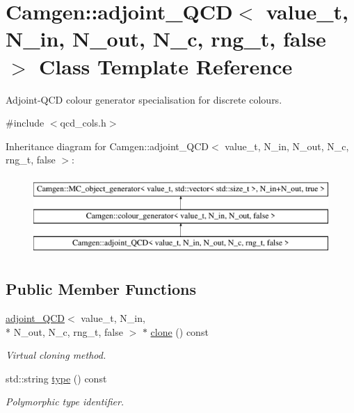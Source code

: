 \hypertarget{a00004}{\section{Camgen\-:\-:adjoint\-\_\-\-Q\-C\-D$<$ value\-\_\-t, N\-\_\-in, N\-\_\-out, N\-\_\-c, rng\-\_\-t, false $>$ Class Template Reference}
\label{a00004}
}


Adjoint-\/\-Q\-C\-D colour generator specialisation for discrete colours.  




{\ttfamily \#include $<$qcd\-\_\-cols.\-h$>$}

Inheritance diagram for Camgen\-:\-:adjoint\-\_\-\-Q\-C\-D$<$ value\-\_\-t, N\-\_\-in, N\-\_\-out, N\-\_\-c, rng\-\_\-t, false $>$\-:\begin{figure}[H]
\begin{center}
\leavevmode
\includegraphics[height=3.000000cm]{a00004}
\end{center}
\end{figure}
\subsection*{Public Member Functions}
\begin{DoxyCompactItemize}
\item 
\hypertarget{a00004_aa2179663ef82c7ffbaf1d56cc6f8aed6}{\hyperlink{a00003}{adjoint\-\_\-\-Q\-C\-D}$<$ value\-\_\-t, N\-\_\-in, \\*
N\-\_\-out, N\-\_\-c, rng\-\_\-t, false $>$ $\ast$ \hyperlink{a00004_aa2179663ef82c7ffbaf1d56cc6f8aed6}{clone} () const }\label{a00004_aa2179663ef82c7ffbaf1d56cc6f8aed6}

\begin{DoxyCompactList}\small\item\em Virtual cloning method. \end{DoxyCompactList}\item 
\hypertarget{a00004_ada2323a7b2d8663e153429e9be08542d}{std\-::string \hyperlink{a00004_ada2323a7b2d8663e153429e9be08542d}{type} () const }\label{a00004_ada2323a7b2d8663e153429e9be08542d}

\begin{DoxyCompactList}\small\item\em Polymorphic type identifier. \end{DoxyCompactList}\end{DoxyCompactItemize}
